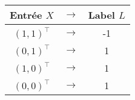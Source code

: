\documentclass{my_class}%
\begin{document}
\begin{enumerate}
\begin{center}
 {\normalsize
\begin{tabular}{|ccc|} \hline
Entrée $X$&$\mathbf{\rightarrow}$ & Label $L$  \\[5pt] \hline
$ {  (1,1)^\top}$ & $\mathbf{\rightarrow}$ & -1 \\[5pt]  \hline
$ { (0,1)^\top}$ & $\mathbf{\rightarrow}$ & 1 \\[5pt]  \hline
$ { (1,0)^\top}$ & $\mathbf{\rightarrow}$ & 1 \\[5pt]  \hline
$ { (0,0)^\top}$ & $\mathbf{\rightarrow}$ & 1 \\[5pt]  \hline
\end{tabular}
}
\end{center}
\end{enumerate}
\end{document}
